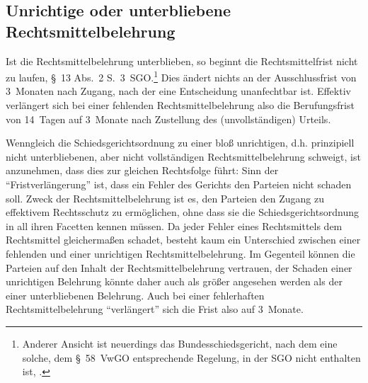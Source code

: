 \subsection{Unrichtige oder unterbliebene Rechtsmittelbelehrung}
Ist die Rechtsmittelbelehrung unterblieben, so beginnt die Rechtsmittelfrist nicht zu laufen, \S~13 Abs.~2 S.~3~SGO.\footnote{Anderer Ansicht ist neuerdings das Bundesschiedsgericht, nach dem eine solche, dem §~58~VwGO entsprechende Regelung, in der SGO nicht enthalten ist, \cite{BSGPP100132493}.}
Dies ändert nichts an der Ausschlussfrist von 3~Monaten nach Zugang, nach der eine Entscheidung unanfechtbar ist.
Effektiv verlängert sich bei einer fehlenden Rechtsmittelbelehrung also die Berufungsfrist von 14~Tagen auf 3~Monate nach Zustellung des (unvollständigen) Urteils.

Wenngleich die Schiedsgerichtsordnung zu einer bloß unrichtigen, d.h. prinzipiell nicht unterbliebenen, aber nicht vollständigen Rechtsmittelbelehrung schweigt, ist anzunehmen, dass dies zur gleichen Rechtsfolge führt:
Sinn der \enquote{Fristverlängerung} ist, dass ein Fehler des Gerichts den Parteien nicht schaden soll.
Zweck der Rechtsmittelbelehrung ist es, den Parteien den Zugang zu effektivem Rechtsschutz zu ermöglichen, ohne dass sie die Schiedsgerichtsordnung in all ihren Facetten kennen müssen.
Da jeder Fehler eines Rechtsmittels dem Rechtsmittel gleichermaßen schadet, besteht kaum ein Unterschied zwischen einer fehlenden und einer unrichtigen Rechtsmittelbelehrung.
Im Gegenteil können die Parteien auf den Inhalt der Rechtsmittelbelehrung vertrauen, der Schaden einer unrichtigen Belehrung könnte daher auch als größer angesehen werden als der einer unterbliebenen Belehrung.
Auch bei einer fehlerhaften Rechtsmittelbelehrung \enquote{verlängert} sich die Frist also auf 3~Monate.


\chapterbib
